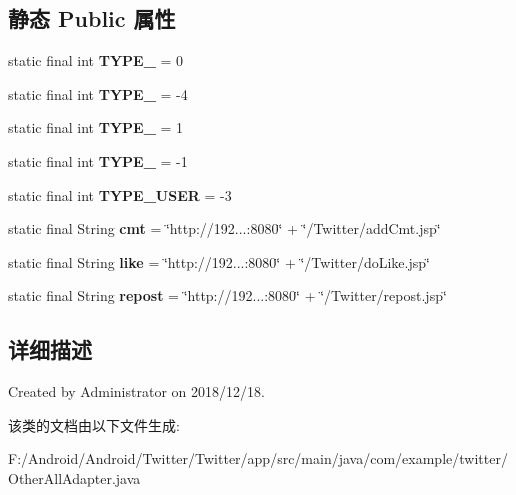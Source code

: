 \subsection*{静态 Public 属性}
\begin{DoxyCompactItemize}
\item 
\mbox{\label{classcom_1_1example_1_1twitter_1_1_other_all_adapter_ab2284c5d2cc8d50bc1e82df80a24676a}} 
static final int {\bfseries T\+Y\+P\+E\+\_} = 0
\item 
\mbox{\label{classcom_1_1example_1_1twitter_1_1_other_all_adapter_af1e901fe63e2d90703913e14df5618ae}} 
static final int {\bfseries T\+Y\+P\+E\+\_} = -\/4
\item 
\mbox{\label{classcom_1_1example_1_1twitter_1_1_other_all_adapter_a6c0ec9a8dd2ac61de9f7c7c51b1f2fe2}} 
static final int {\bfseries T\+Y\+P\+E\+\_} = 1
\item 
\mbox{\label{classcom_1_1example_1_1twitter_1_1_other_all_adapter_a3477d899f7defb5a476b81adbfc524ea}} 
static final int {\bfseries T\+Y\+P\+E\+\_} = -\/1
\item 
\mbox{\label{classcom_1_1example_1_1twitter_1_1_other_all_adapter_a3a3275d74dc3c783605eb6fd1bf2a978}} 
static final int {\bfseries T\+Y\+P\+E\+\_\+\+U\+S\+ER} = -\/3
\item 
\mbox{\label{classcom_1_1example_1_1twitter_1_1_other_all_adapter_a05eb809bf34f60df96d4c960b4e686bd}} 
static final String {\bfseries cmt} = \char`\"{}http\+://192...\+:8080\char`\"{} + \char`\"{}/Twitter/add\+Cmt.\+jsp\char`\"{}
\item 
\mbox{\label{classcom_1_1example_1_1twitter_1_1_other_all_adapter_ad88d90c4549b06eb99c5e55f83ddd221}} 
static final String {\bfseries like} = \char`\"{}http\+://192...\+:8080\char`\"{} + \char`\"{}/Twitter/do\+Like.\+jsp\char`\"{}
\item 
\mbox{\label{classcom_1_1example_1_1twitter_1_1_other_all_adapter_a494d7930cc64ea9e60b8c6ffe006c4ff}} 
static final String {\bfseries repost} = \char`\"{}http\+://192...\+:8080\char`\"{} + \char`\"{}/Twitter/repost.\+jsp\char`\"{}
\end{DoxyCompactItemize}


\subsection{详细描述}
Created by Administrator on 2018/12/18. 

该类的文档由以下文件生成\+:\begin{DoxyCompactItemize}
\item 
F\+:/\+Android/\+Android/\+Twitter/\+Twitter/app/src/main/java/com/example/twitter/Other\+All\+Adapter.\+java\end{DoxyCompactItemize}
